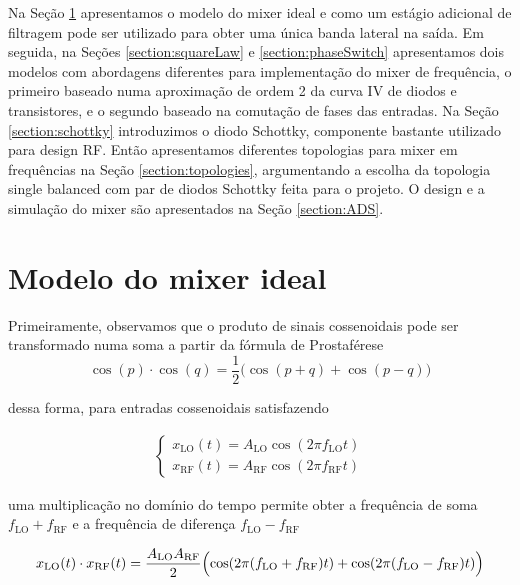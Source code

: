 \documentclass[10pt]{article}
\begin{document}
Na Seção \ref{section:ideal} apresentamos o modelo do mixer ideal e como um estágio adicional de filtragem pode ser utilizado para obter uma única banda lateral na saída. Em seguida, na Seções \ref{section:squareLaw} e \ref{section:phaseSwitch} apresentamos dois modelos com abordagens diferentes para implementação do mixer de frequência, o primeiro baseado numa aproximação de ordem 2 da curva IV de diodos e transistores, e o segundo baseado na comutação de fases das entradas. Na Seção \ref{section:schottky} introduzimos o diodo Schottky, componente bastante utilizado para design RF. Então apresentamos diferentes topologias para mixer em frequências na Seção \ref{section:topologies}, argumentando a escolha da topologia single balanced com par de diodos Schottky feita para o projeto. O design e a simulação do mixer são apresentados na Seção \ref{section:ADS}.

\section{Modelo do mixer ideal} \label{section:ideal}

Primeiramente, observamos que o produto de sinais cossenoidais pode ser transformado numa soma a partir da fórmula de Prostaférese
\begin{equation*}
    \cos(p) \cdot \cos(q) = \frac{1}{2} \bigl( \cos(p+q) + \cos(p-q) \bigr)
\end{equation*}

dessa forma, para entradas cossenoidais satisfazendo

\begin{align*}
    \begin{cases}
        x_{\text{LO}}(t) = A_{\text{LO}} \cos(2 \pi f_{\text{LO}} t) \\
        x_{\text{RF}}(t) = A_{\text{RF}} \cos(2 \pi f_{\text{RF}} t)
    \end{cases}
\end{align*}

uma multiplicação no domínio do tempo permite obter a frequência de soma $f_{\text{LO}} + f_{\text{RF}}$ e a frequência de diferença $f_{\text{LO}} - f_{\text{RF}}$

\begin{equation*}
    x_{\text{LO}}(t) \cdot x_{\text{RF}}(t) = \frac{A_{\text{LO}} A_{\text{RF}}}{2} \Bigl( \cos(2 \pi (f_{\text{LO}} + f_{\text{RF}}) t) + \cos(2 \pi (f_{\text{LO}} - f_{\text{RF}}) t)\Bigr)
\end{equation*}
\end{document}
